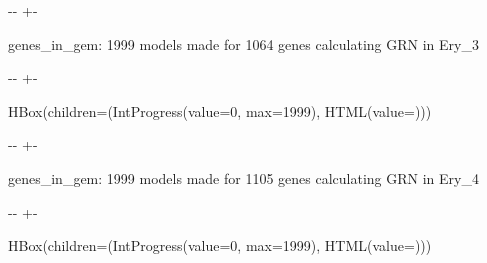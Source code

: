 \documentclass[letterpaper,10pt,english]{sphinxmanual}
\newlength\nbsphinxcodecellspacing
\begin{document}
%
{
\kern-\sphinxverbatimsmallskipamount\kern-\baselineskip
\kern+\FrameHeightAdjust\kern-\fboxrule
\vspace{\nbsphinxcodecellspacing}
%
\begin{sphinxVerbatim}[commandchars=\\\{\}]

genes\_in\_gem: 1999
models made for 1064 genes
calculating GRN in Ery\_3
\end{sphinxVerbatim}
}
\relax

{

\kern-\sphinxverbatimsmallskipamount\kern-\baselineskip
\kern+\FrameHeightAdjust\kern-\fboxrule
\vspace{\nbsphinxcodecellspacing}

%
\begin{sphinxVerbatim}[commandchars=\\\{\}]
HBox(children=(IntProgress(value=0, max=1999), HTML(value=\PYGZsq{}\PYGZsq{})))
\end{sphinxVerbatim}
}



%
{
\kern-\sphinxverbatimsmallskipamount\kern-\baselineskip
\kern+\FrameHeightAdjust\kern-\fboxrule
\vspace{\nbsphinxcodecellspacing}
%
\begin{sphinxVerbatim}[commandchars=\\\{\}]

genes\_in\_gem: 1999
models made for 1105 genes
calculating GRN in Ery\_4
\end{sphinxVerbatim}
}
\relax

{

\kern-\sphinxverbatimsmallskipamount\kern-\baselineskip
\kern+\FrameHeightAdjust\kern-\fboxrule
\vspace{\nbsphinxcodecellspacing}

%
\begin{sphinxVerbatim}[commandchars=\\\{\}]
HBox(children=(IntProgress(value=0, max=1999), HTML(value=\PYGZsq{}\PYGZsq{})))
\end{sphinxVerbatim}
}
\end{document}

